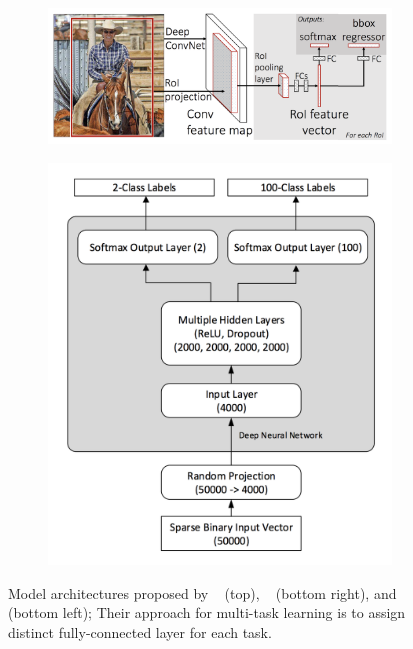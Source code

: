 \documentclass{article}
\begin{document}
\begin{figure}[t!]
	\centering
	\begin{subfigure}[b]{.65\linewidth}
		\centering
		\includegraphics[scale=0.25,trim={0mm 0mm 0mm 0mm},clip]{girshick2015fast.png}
	\end{subfigure}%
	\begin{subfigure}[b]{.35\linewidth}
		\centering
		\includegraphics[scale=0.15,trim={0mm 0mm 0mm 0mm},clip]{huang2016mtnet.png}
	\end{subfigure}
	\caption{Model architectures proposed by ~\cite{long2017learning} (top), ~\cite{huang2016mtnet} (bottom right), and  ~\cite{girshick2015fast} (bottom left); Their approach for multi-task learning is to assign distinct fully-connected layer for each task.}
	\label{figure:mutli-task-learning}
\end{figure}
\end{document}
